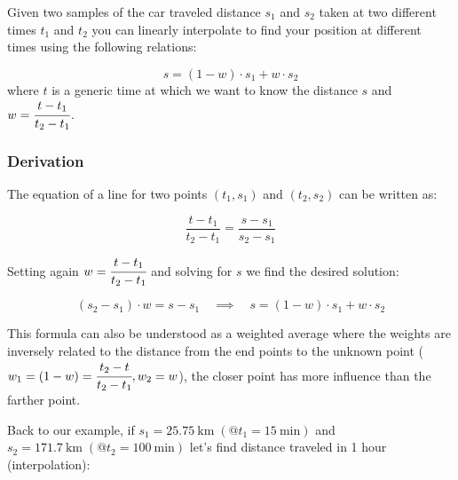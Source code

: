 Given two samples of the car traveled distance \(s_1\) and \(s_2\) taken at two different times \(t_1\) and \(t_2\) you can linearly interpolate to find your position at different times using the following relations:

\begin{equation}
s = (1 - w)\cdot s_1 + w \cdot s_2
\end{equation}
where $t$ is a generic time at which we want to know the distance $s$ and \(w = \cfrac{t - t_1}{t_2 - t_1}\).

\begin{tcolorbox}[breakable, size=fbox, boxrule=1pt, pad at break*=1mm, colframe=cellborder, colback=cream]
\subsubsection{Derivation}
The equation of a line for two points
\((t_1, s_1)\) and \((t_2, s_2)\) can be written as:

\begin{equation}
\frac{t - t_1}{t_2 - t_1} = \frac{s - s_1}{s_2 - s_1}
\end{equation}

Setting again \(w = \cfrac{t - t_1}{t_2 - t_1}\) and solving for \(s\) we find the desired solution:

\begin{equation}(s_2 - s_1)\cdot w = s - s_1\quad\implies\quad s = (1 - w)\cdot s_1 + w \cdot s_2
\end{equation}

This formula can also be understood as a weighted average where the weights are inversely related to the distance from the end points to the unknown point ($w_1 = (1 - w) = \cfrac{t_2 - t}{t_2 -t_1}, w_2 = w$), the closer point has more influence than the farther point.
\end{tcolorbox}

Back to our example, if
\(s_1 = 25.75~\mathrm{km}\;(@t_1 = 15~\mathrm{min})\) and
\(s_2 = 171.7~\mathrm{km}\;(@t_2 = 100~\mathrm{min})\) let's find distance traveled in 1 hour (interpolation):

